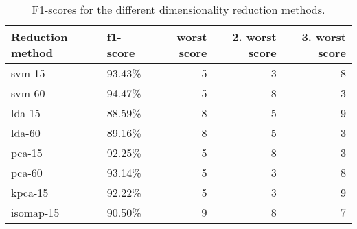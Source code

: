 \begin{table}
    \centering
    \begin{tabular}{llrrr}
        \hline
        Reduction method & f1-score & worst score & 2. worst score & 3. worst score \\
        \hline
        \gls{svm}-15 & 93.43\% & 5 & 3 & 8 \\
        \gls{svm}-60 & 94.47\% & 5 & 8 & 3 \\
        \gls{lda}-15 & 88.59\% & 8 & 5 & 9 \\
        \gls{lda}-60 & 89.16\% & 8 & 5 & 3 \\
        \gls{pca}-15 & 92.25\% & 5 & 8 & 3 \\
        \gls{pca}-60 & 93.14\% & 5 & 3 & 8 \\
        \gls{kpca}-15 & 92.22\% & 5 & 3 & 9 \\
        \gls{isomap}-15 & 90.50\% & 9 & 8 & 7 \\
        \hline
    \end{tabular}
    \caption{F1-scores for the different dimensionality reduction methods.}
    \label{tab:discussion-experiment-1-f1-score}
    \end{table}
